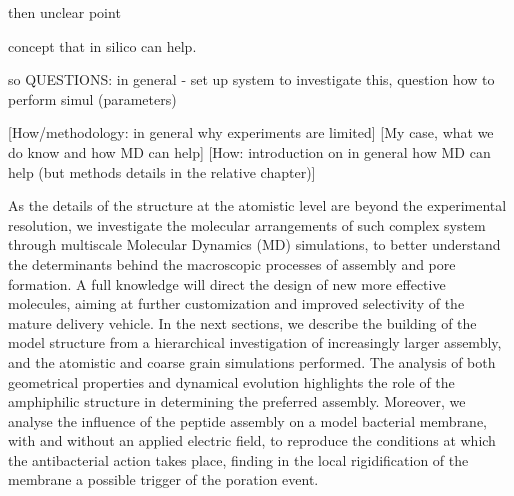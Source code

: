 then unclear point

concept that in silico can help.

so QUESTIONS:
in general - set up system to investigate this, question how to perform simul (parameters)


[How/methodology: in general why experiments are limited]
[My case, what we do know and how MD can help]
[How: introduction on in general how MD can help (but methods details in the relative chapter)]


As the details of the structure at the atomistic level are beyond the experimental resolution, we investigate the molecular arrangements of such complex system through multiscale Molecular Dynamics (MD) simulations, to better understand the determinants behind the macroscopic processes of assembly and pore formation.
A full knowledge will direct the design of new more effective molecules, aiming at further customization and improved selectivity of the mature delivery vehicle.
In the next sections, we describe the building of the model structure from a hierarchical investigation of increasingly larger assembly, and the atomistic and coarse grain simulations performed. The analysis of both geometrical properties and dynamical evolution highlights the role of the amphiphilic structure in determining the preferred assembly.
Moreover, we analyse the influence of the peptide assembly on a model bacterial membrane, with and without an applied electric field, to reproduce the conditions at which the antibacterial action takes place, finding in the local rigidification of the membrane a possible trigger of the poration event.


